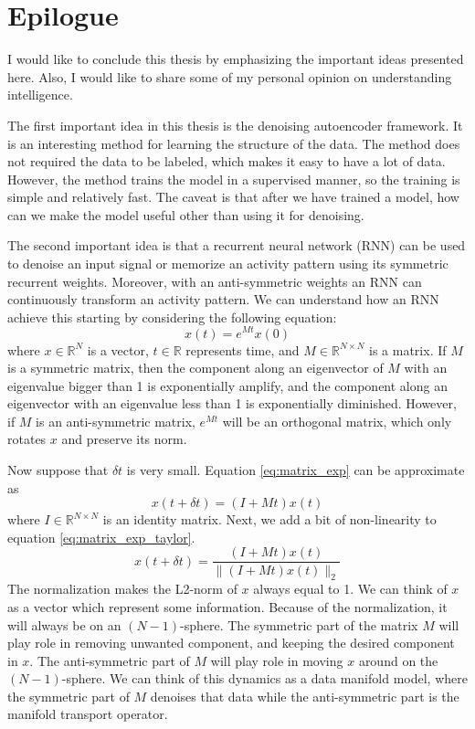 \section{Epilogue}

I would like to conclude this thesis by emphasizing the important ideas presented here. Also, I would like to share some of my personal opinion on understanding intelligence.

The first important idea in this thesis is the denoising autoencoder framework. It is an interesting method for learning the structure of the data. The method does not required the data to be labeled, which makes it easy to have a lot of data. However, the method trains the model in a supervised manner, so the training is simple and relatively fast. The caveat is that after we have trained a model, how can we make the model useful other than using it for denoising.

The second important idea is that a recurrent neural network (RNN) can be used to denoise an input signal or memorize an activity pattern using its symmetric recurrent weights. Moreover, with an anti-symmetric weights an RNN can continuously transform an activity pattern. We can understand how an RNN achieve this starting by considering the following equation:
\begin{equation}
\label{eq:matrix_exp}
x(t) = e^{Mt} x(0)
\end{equation}
where $x \in \mathbb{R}^N$ is a vector, $t \in \mathbb{R}$ represents time, and $M \in \mathbb{R}^{N\times N}$ is a matrix. If $M$ is a symmetric matrix, then the component along an eigenvector of $M$ with an eigenvalue bigger than 1 is exponentially amplify, and the component along an eigenvector with an eigenvalue less than 1 is exponentially diminished. However, if $M$ is an anti-symmetric matrix, $e^{Mt}$ will be an orthogonal matrix, which only rotates $x$ and preserve its norm.

Now suppose that $\delta t$ is very small. Equation \ref{eq:matrix_exp} can be approximate as
\begin{equation}
\label{eq:matrix_exp_taylor}
x(t+\delta t) = (I + Mt) x(t)
\end{equation}
where $I \in \mathbb{R}^{N\times N}$ is an identity matrix. Next, we add a bit of non-linearity to equation \ref{eq:matrix_exp_taylor}.
\begin{equation}
\label{eq:matrix_exp_norm}
x(t+\delta t) = \frac{(I + Mt) x(t)}{\|(I + Mt) x(t)\|_2}
\end{equation}
The normalization makes the L2-norm of $x$ always equal to 1. We can think of $x$ as a vector which represent some information. Because of the normalization, it will always be on an $(N-1)$-sphere. The symmetric part of the matrix $M$ will play role in removing unwanted component, and keeping the desired component in $x$. The anti-symmetric part of $M$ will play role in moving $x$ around on the $(N-1)$-sphere. We can think of this dynamics as a data manifold model, where the symmetric part of $M$ denoises that data while the anti-symmetric part is the manifold transport operator.

